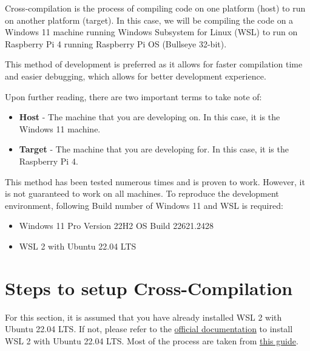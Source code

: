 Cross-compilation is the process of compiling code on one platform (host) to run
on another platform (target). In this case, we will be compiling the code on a
Windows 11 machine running Windows Subsystem for Linux (WSL) to run on Raspberry
Pi 4 running Raspberry Pi OS (Bullseye 32-bit).

This method of development is preferred as it allows for faster compilation time
and easier debugging, which allows for better development experience.

Upon further reading, there are two important terms to take note of:

\begin{itemize}
      \item \textbf{Host} - The machine that you are developing on. In this case, it is the Windows 11 machine.
      \item \textbf{Target} - The machine that you are developing for. In this case, it is the Raspberry Pi 4.
\end{itemize}

This method has been tested numerous times and is proven to work. However, it is
not guaranteed to work on all machines. To reproduce the development
environment, following Build number of Windows 11 and WSL is required:

\begin{itemize}
      \item Windows 11 Pro Version 22H2 OS Build 22621.2428
      \item WSL 2 with Ubuntu 22.04 LTS
\end{itemize}

\section{Steps to setup Cross-Compilation}

For this section, it is assumed that you have already installed WSL 2 with
Ubuntu 22.04 LTS. If not, please refer to the
\href{https://docs.microsoft.com/en-us/windows/wsl/install-win10}{official documentation} to install WSL 2 with Ubuntu 22.04 LTS. Most of the process are taken from \href{https://github.com/abhiTronix/raspberry-pi-cross-compilers/wiki/Cross-Compiler-CMake-Usage-Guide-with-rsynced-Raspberry-Pi-32-bit-OS#cross-compiler-cmake-usage-guide-with-rsynced-raspberry-pi-32-bit-OS}{this guide}.

